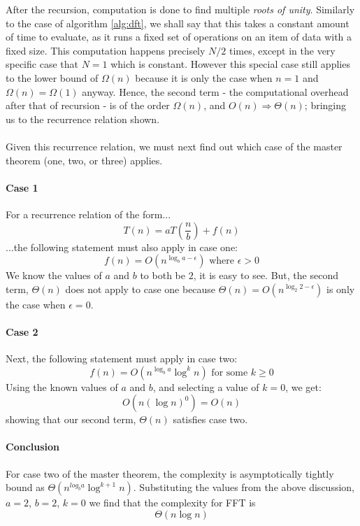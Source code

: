 \documentclass[]{article}
\begin{document}
After the recursion, computation is done to find multiple \emph{roots of unity}. Similarly to the case of algorithm \ref{alg:dft}, we shall say that this takes a constant amount of time to evaluate, as it runs a fixed set of operations on an item of data with a fixed size. This computation happens precisely $N/2$ times, except in the very specific case that $N = 1$ which is constant. However this special case still applies to the lower bound of $\Omega(n)$ because it is only the case when $n = 1$ and $\Omega(n) = \Omega(1)$ anyway. Hence, the second term - the computational overhead after that of recursion - is of the order $\Omega(n)$, and $O(n) \Rightarrow \Theta(n)$; bringing us to the recurrence relation shown.
\\\\
Given this recurrence relation, we must next find out which case of the master theorem (one, two, or three) applies.
\paragraph{Case 1}
For a recurrence relation of the form...
$$T(n) = aT(\frac{n}{b}) + f(n)$$
...the following statement must also apply in case one:
\[
f(n) = O(n^{\log_b{a - \epsilon}}) \text{ where } \epsilon > 0
\]
We know the values of $a$ and $b$ to both be $2$, it is easy to see. But, the second term, $\Theta(n)$ does not apply to case one because $\Theta(n) = O(n^{\log_2{2 - \epsilon}})$ is only the case when $\epsilon = 0$.

\paragraph{Case 2}
Next, the following statement must apply in case two:
\[
f(n) = O(n^{\log_b{a}}\log^k{n}) \text{ for some } k \geq 0
\]
Using the known values of $a$ and $b$, and selecting a value of $k = 0$, we get:
\[
O(n(\log{n})^0) = O(n)
\]
showing that our second term, $\Theta(n)$ satisfies case two.

\paragraph{Conclusion}
For case two of the master theorem, the complexity is asymptotically tightly bound as $\Theta(n^{log_b{a}}\log^{k + 1}n)$. Substituting the values from the above discussion, $a = 2$, $b = 2$, $k = 0$ we find that the complexity for FFT is $$\Theta(n\log{n})$$
\end{document}

